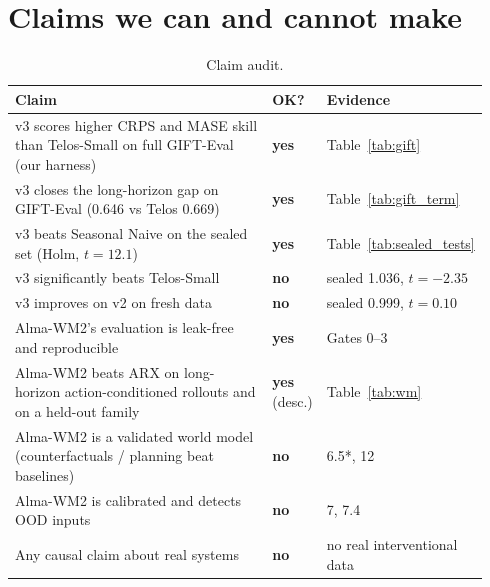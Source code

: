 \documentclass[10pt,a4paper]{extarticle}
\newcommand{\yes}{\textcolor{good}{\textbf{yes}}}
\newcommand{\no}{\textcolor{bad}{\textbf{no}}}
\begin{document}
\section{Claims we can and cannot make}
\begin{table}[H]
\centering\small
\caption{Claim audit.}
\label{tab:claims}
\begin{tabular}{@{}p{0.62\linewidth}p{0.08\linewidth}p{0.24\linewidth}@{}}
\toprule
Claim & OK? & Evidence \\
\midrule
v3 scores higher CRPS and MASE skill than Telos-Small on full GIFT-Eval (our harness) & \yes & Table~\ref{tab:gift} \\
v3 closes the long-horizon gap on GIFT-Eval (0.646 vs Telos 0.669) & \yes & Table~\ref{tab:gift_term} \\
v3 beats Seasonal Naive on the sealed set (Holm, $t=12.1$) & \yes & Table~\ref{tab:sealed_tests} \\
v3 significantly beats Telos-Small & \no & sealed 1.036, $t=-2.35$ \\
v3 improves on v2 on fresh data & \no & sealed 0.999, $t=0.10$ \\
Alma-WM2's evaluation is leak-free and reproducible & \yes & Gates 0--3 \\
Alma-WM2 beats ARX on long-horizon action-conditioned rollouts and on a held-out family & \yes\,(desc.) & Table~\ref{tab:wm} \\
Alma-WM2 is a validated world model (counterfactuals / planning beat baselines) & \no & 6.5*, 12 \\
Alma-WM2 is calibrated and detects OOD inputs & \no & 7, 7.4 \\
Any causal claim about real systems & \no & no real interventional data \\
\bottomrule
\end{tabular}
\end{table}

\end{document}
